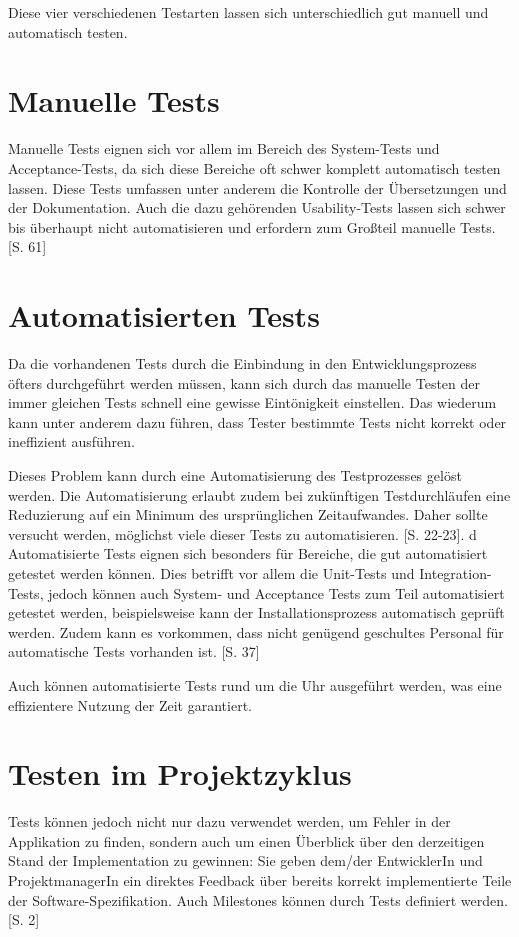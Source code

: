 \documentclass[a4paper,bibtotoc,oneside]{scrbook}
\begin{document}
Diese vier verschiedenen Testarten lassen sich unterschiedlich gut manuell und automatisch testen.

\section{Manuelle Tests}
Manuelle Tests eignen sich vor allem im Bereich des System-Tests und Acceptance-Tests, da sich diese Bereiche oft schwer komplett automatisch testen lassen. Diese Tests umfassen unter anderem die Kontrolle der Übersetzungen und der Dokumentation. Auch die dazu gehörenden Usability-Tests lassen sich schwer bis überhaupt nicht automatisieren und erfordern zum Großteil manuelle Tests. \cite{test_large_systems}[S. 61]


\section{Automatisierten Tests}
Da die vorhandenen Tests durch die Einbindung in den Entwicklungsprozess öfters durchgeführt werden müssen, kann sich durch das manuelle Testen der immer gleichen Tests schnell eine gewisse Eintönigkeit einstellen. Das wiederum kann unter anderem dazu führen, dass Tester bestimmte Tests nicht korrekt oder ineffizient ausführen. 

Dieses Problem kann durch eine Automatisierung des Testprozesses gelöst werden. Die Automatisierung erlaubt zudem bei zukünftigen Testdurchläufen eine Reduzierung auf ein Minimum des ursprünglichen Zeitaufwandes. Daher sollte versucht werden, möglichst viele dieser Tests zu automatisieren. \cite{test_auto}[S. 22-23]. 
d
Automatisierte Tests eignen sich besonders für Bereiche, die gut automatisiert getestet werden können. Dies betrifft vor allem die Unit-Tests und Integration-Tests, jedoch können auch System- und Acceptance Tests zum Teil automatisiert getestet werden, beispielsweise kann der Installationsprozess automatisch geprüft werden. Zudem kann es vorkommen, dass nicht genügend geschultes Personal für automatische Tests vorhanden ist. \cite{eval_automat_webapp_test}[S. 37]

Auch können automatisierte Tests rund um die Uhr ausgeführt werden, was eine effizientere Nutzung der Zeit garantiert.

\section{Testen im Projektzyklus}
Tests können jedoch nicht nur dazu verwendet werden, um Fehler in der Applikation zu finden, sondern auch um einen Überblick über den derzeitigen Stand der Implementation zu gewinnen: Sie geben dem/der EntwicklerIn und ProjektmanagerIn ein direktes Feedback über bereits korrekt implementierte Teile der Software-Spezifikation. Auch Milestones können durch Tests definiert werden. \cite{test_auto}[S. 2]
\end{document}

